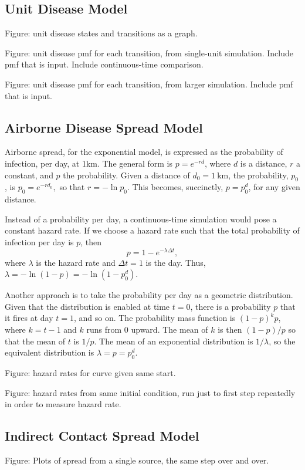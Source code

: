 \documentclass{article}
\begin{document}
\subsection{Unit Disease Model}
Figure: unit disease states and transitions as a graph.

Figure: unit disease pmf for each transition, from single-unit simulation.
        Include pmf that is input. Include continuous-time comparison.

Figure: unit disease pmf for each transition, from larger simulation.
        Include pmf that is input.


\subsection{Airborne Disease Spread Model}
Airborne spread, for the exponential model, is expressed
as the probability of infection, per day, at 1km.
The general form is $p=e^{-rd}$, where $d$ is a distance, $r$ a constant,
and $p$ the probability.
Given a distance of $d_0=1\:\mbox{km}$, the probability, $p_0$, is
$p_0 = e^{-r d_0},$
so that $r=-\ln p_0$. This becomes, succinctly, $p=p_0^d$, for
any given distance.

Instead of a probability per day, a continuous-time simulation would
pose a constant hazard rate. If we choose a hazard rate such that the
total probability of infection per day is $p$, then
\begin{equation}
  p=1-e^{-\lambda \Delta t},
\end{equation}
where $\lambda$ is the hazard rate and $\Delta t=1$ is the day. Thus,
$\lambda=-\ln(1-p)=-\ln(1-p_0^d)$.

Another approach is to take the probability per day as a geometric
distribution. Given that the distribution is enabled at time $t=0$,
there is a probability $p$ that it fires at day $t=1$, and so on.
The probability mass function is $(1-p)^k p$, where $k=t-1$ and $k$
runs from 0 upward. The mean of $k$ is  then $(1-p)/p$ so that the
mean of $t$ is $1/p$. The mean of an exponential distribution is
$1/\lambda$, so the equivalent distribution is $\lambda=p=p_0^d$.

Figure: hazard rates for curve given same start.

Figure: hazard rates from same initial condition, run just to first step
        repeatedly in order to measure hazard rate.


\subsection{Indirect Contact Spread Model}
Figure: Plots of spread from a single source, the same step over and over.
\end{document}
